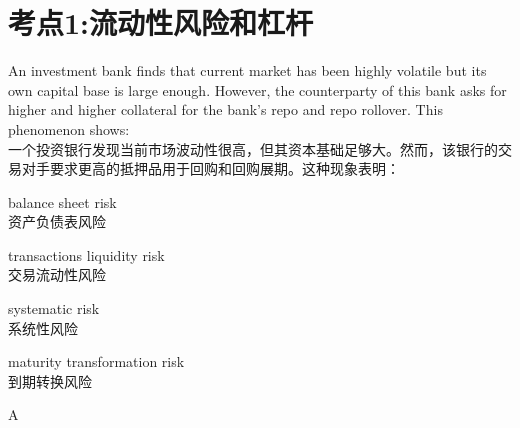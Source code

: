 \documentclass{article}
\newcounter{question} %
\begin{document}
 \tableofcontents %
\newpage





\section{考点1:流动性风险和杠杆}
\setcounter{question}{0}



\begin{question}
    An investment bank finds that current market has been highly volatile but its own capital base is large enough. However, the counterparty of this bank asks for higher and higher collateral for the bank’s repo and repo rollover. This phenomenon shows:\\
    一个投资银行发现当前市场波动性很高，但其资本基础足够大。然而，该银行的交易对手要求更高的抵押品用于回购和回购展期。这种现象表明：
\end{question}

\begin{choices}
    \item balance sheet risk\\
    资产负债表风险
    \item transactions liquidity risk\\
    交易流动性风险
    \item systematic risk\\
    系统性风险
    \item maturity transformation risk\\
    到期转换风险
\end{choices}

\begin{correctanswer}
    A
\end{correctanswer}
\end{document}
